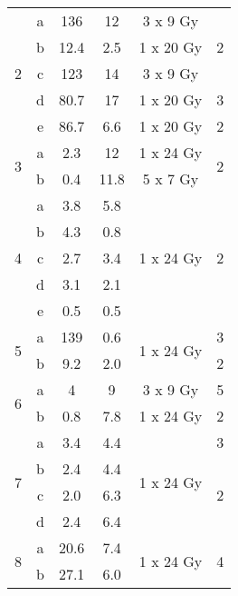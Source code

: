 \documentclass[type=dr, dr=rernat, accentcolor=tud7b,colorbacktitle, bigchapter, openright, twoside, 12pt ]{tudthesis}
\begin{document}
\begin{table}[H]
\begin{tabular}{c|c|c|c|c|c}
		 \hline
		 \multirow{5}{*}{2} & a & 136 & 12  & 3 x 9 Gy & \multirow{3}{*}{2} \\
		  & b & 12.4 & 2.5  & 1 x 20 Gy &  \\
		  & c & 123 & 14  & 3 x 9 Gy &  \\
		 & d & 80.7 & 17  & 1 x 20 Gy & 3 \\
		 & e & 86.7 & 6.6  & 1 x 20 Gy & 2 \\
		 \hline
		 \multirow{2}{*}{3} & a & 2.3 & 12  & 1 x 24 Gy & \multirow{2}{*}{2} \\
		 & b & 0.4 & 11.8  & 5 x 7 Gy &  \\
		 \hline
		 \multirow{5}{*}{4} & a & 3.8 & 5.8  & \multirow{5}{*}{1 x 24 Gy} & \multirow{5}{*}{2} \\
		  & b & 4.3 & 0.8  &  & \\
		  & c & 2.7 & 3.4  &  & \\
		  & d & 3.1 & 2.1  &  & \\
		  & e & 0.5 & 0.5  &  & \\
		  \hline
		  \multirow{2}{*}{5} & a & 139 & 0.6 & \multirow{2}{*}{1 x 24 Gy} & 3 \\
		 & b & 9.2 & 2.0  &  & 2 \\
		 \hline
		 \multirow{2}{*}{6} & a & 4 & 9  & 3 x 9 Gy  & 5 \\
		 & b & 0.8 & 7.8  & 1 x 24 Gy & 2 \\
		 \hline
		 \multirow{4}{*}{7} & a & 3.4   & 4.4    & \multirow{4}{*}{1 x 24 Gy} & 3  \\
				    & b & 2.4 & 4.4  & & \multirow{3}{*}{2} \\
				    & c & 2.0 & 6.3  & & \\
				    & d & 2.4 & 6.4  & & \\
		\hline	    
		\multirow{2}{*}{8} & a & 20.6 & 7.4 & \multirow{2}{*}{1 x 24 Gy} & \multirow{2}{*}{4}  \\
		 & b & 27.1 & 6.0  &  &   \\
		 

\end{tabular}
\end{table}
\end{document}
